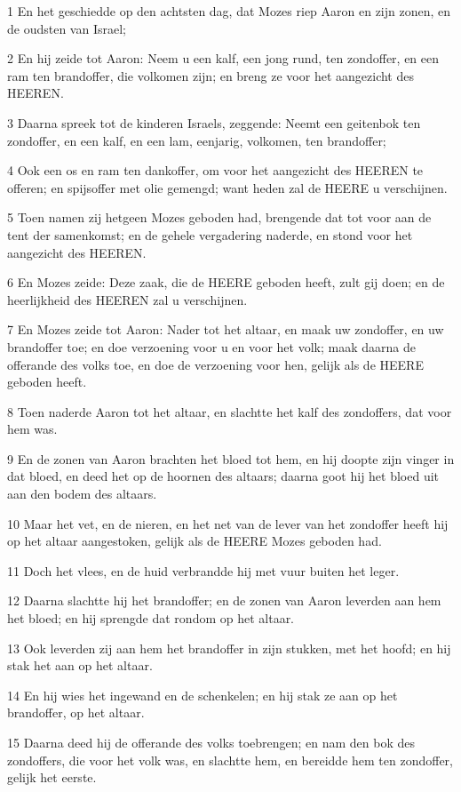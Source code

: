 \par 1 En het geschiedde op den achtsten dag, dat Mozes riep Aaron en zijn zonen, en de oudsten van Israel;
\par 2 En hij zeide tot Aaron: Neem u een kalf, een jong rund, ten zondoffer, en een ram ten brandoffer, die volkomen zijn; en breng ze voor het aangezicht des HEEREN.
\par 3 Daarna spreek tot de kinderen Israels, zeggende: Neemt een geitenbok ten zondoffer, en een kalf, en een lam, eenjarig, volkomen, ten brandoffer;
\par 4 Ook een os en ram ten dankoffer, om voor het aangezicht des HEEREN te offeren; en spijsoffer met olie gemengd; want heden zal de HEERE u verschijnen.
\par 5 Toen namen zij hetgeen Mozes geboden had, brengende dat tot voor aan de tent der samenkomst; en de gehele vergadering naderde, en stond voor het aangezicht des HEEREN.
\par 6 En Mozes zeide: Deze zaak, die de HEERE geboden heeft, zult gij doen; en de heerlijkheid des HEEREN zal u verschijnen.
\par 7 En Mozes zeide tot Aaron: Nader tot het altaar, en maak uw zondoffer, en uw brandoffer toe; en doe verzoening voor u en voor het volk; maak daarna de offerande des volks toe, en doe de verzoening voor hen, gelijk als de HEERE geboden heeft.
\par 8 Toen naderde Aaron tot het altaar, en slachtte het kalf des zondoffers, dat voor hem was.
\par 9 En de zonen van Aaron brachten het bloed tot hem, en hij doopte zijn vinger in dat bloed, en deed het op de hoornen des altaars; daarna goot hij het bloed uit aan den bodem des altaars.
\par 10 Maar het vet, en de nieren, en het net van de lever van het zondoffer heeft hij op het altaar aangestoken, gelijk als de HEERE Mozes geboden had.
\par 11 Doch het vlees, en de huid verbrandde hij met vuur buiten het leger.
\par 12 Daarna slachtte hij het brandoffer; en de zonen van Aaron leverden aan hem het bloed; en hij sprengde dat rondom op het altaar.
\par 13 Ook leverden zij aan hem het brandoffer in zijn stukken, met het hoofd; en hij stak het aan op het altaar.
\par 14 En hij wies het ingewand en de schenkelen; en hij stak ze aan op het brandoffer, op het altaar.
\par 15 Daarna deed hij de offerande des volks toebrengen; en nam den bok des zondoffers, die voor het volk was, en slachtte hem, en bereidde hem ten zondoffer, gelijk het eerste.
